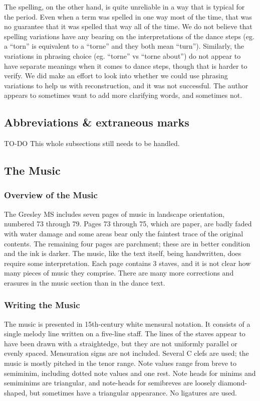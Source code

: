 \documentclass[12pt,letter]{article} %
\begin{document}
The spelling, on the other hand, is quite unreliable in a way that is typical for the period. Even when a term was spelled in one way most of the time, that was no guarantee that it was spelled that way all of the time. We do not believe that spelling variations have any bearing on the interpretations of the dance steps (eg. a “torn” is equivalent to a “torne” and they both mean “turn”). Similarly, the variations in phrasing choice (eg. “torne” vs “torne about”) do not appear to have separate meanings when it comes to dance steps, though that is harder to verify. We did make an effort to look into whether we could use phrasing variations to help us with reconstruction, and it was not successful. The author appears to sometimes want to add more clarifying words, and sometimes not. 

\subsection{Abbreviations \& extraneous marks}
TO-DO This whole subsections still needs to be handled.

\newpage 
\subsection{The Music}
\subsubsection{Overview of the Music}
The Gresley MS includes seven pages of music in landscape orientation, numbered 73 through 79.  Pages 73 through 75, which are paper, are badly faded with water damage and some areas bear only the faintest trace of the original contents.  The remaining four pages are parchment; these are in better condition and the ink is darker.  The music, like the text itself, being handwritten, does require some interpretation. Each page contains 3 staves, and it is not clear how many pieces of music they comprise. There are many more corrections and erasures in the music section than in the dance text. 

\subsubsection{Writing the Music}

The music is presented in 15th-century white mensural notation. It consists of a single melody line written on a five-line staff.  The lines of the staves appear to have been drawn with a straightedge, but they are not uniformly parallel or evenly spaced. Mensuration signs are not included.  Several C clefs are used; the music is mostly pitched in the tenor range.  Note values range from breve to semiminim, including dotted note values and one rest.  Note heads for minims and semiminims are triangular, and note-heads for semibreves are loosely diamond-shaped, but sometimes have a triangular appearance.  No ligatures are used.
\end{document}
